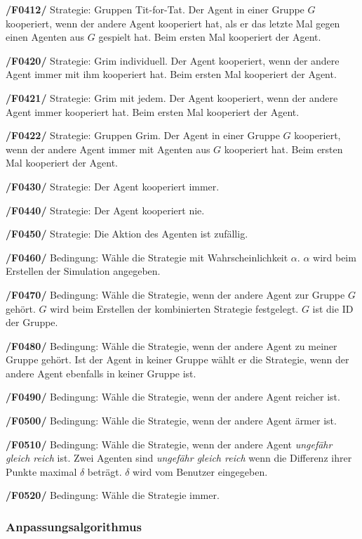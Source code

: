 \textbf{/F0412/}
Strategie: Gruppen Tit-for-Tat. Der Agent in einer Gruppe $G$ kooperiert, wenn der andere Agent kooperiert hat, als er das letzte Mal gegen einen Agenten aus $G$ gespielt hat. Beim ersten Mal kooperiert der Agent.

\textbf{/F0420/} 
Strategie: Grim individuell. Der Agent kooperiert, wenn der andere Agent immer mit ihm kooperiert hat. Beim ersten Mal kooperiert der Agent.

\textbf{/F0421/}
Strategie: Grim mit jedem. Der Agent kooperiert, wenn der andere Agent immer kooperiert hat. Beim ersten Mal kooperiert der Agent.

\textbf{/F0422/}
Strategie: Gruppen Grim. Der Agent in einer Gruppe $G$ kooperiert, wenn der andere Agent immer mit Agenten aus $G$ kooperiert hat. Beim ersten Mal kooperiert der Agent.

\textbf{/F0430/} 
Strategie: Der Agent kooperiert immer.

\textbf{/F0440/}
Strategie: Der Agent kooperiert nie.

\textbf{/F0450/}
Strategie: Die Aktion des Agenten ist zufällig.

\textbf{/F0460/}
Bedingung: Wähle die Strategie mit Wahrscheinlichkeit $\alpha$. $\alpha$ wird beim Erstellen der Simulation angegeben.

\textbf{/F0470/}
Bedingung: Wähle die Strategie, wenn der andere Agent zur Gruppe $G$ gehört. $G$ wird beim Erstellen der kombinierten Strategie festgelegt. $G$ ist die ID der Gruppe.

\textbf{/F0480/}
Bedingung: Wähle die Strategie, wenn der andere Agent zu meiner Gruppe gehört. Ist der Agent in keiner Gruppe wählt er die Strategie, wenn der andere Agent ebenfalls in keiner Gruppe ist.

\textbf{/F0490/}
Bedingung: Wähle die Strategie, wenn der andere Agent reicher ist.

\textbf{/F0500/}
Bedingung: Wähle die Strategie, wenn der andere Agent ärmer ist.

\textbf{/F0510/}
Bedingung: Wähle die Strategie, wenn der andere Agent \emph{ungefähr gleich reich} ist. Zwei Agenten sind \emph{ungefähr gleich reich} wenn die Differenz ihrer Punkte maximal $\delta$ beträgt. $\delta$ wird vom Benutzer eingegeben. 

\textbf{/F0520/}
Bedingung: Wähle die Strategie immer.

\subsubsection{Anpassungsalgorithmus}

